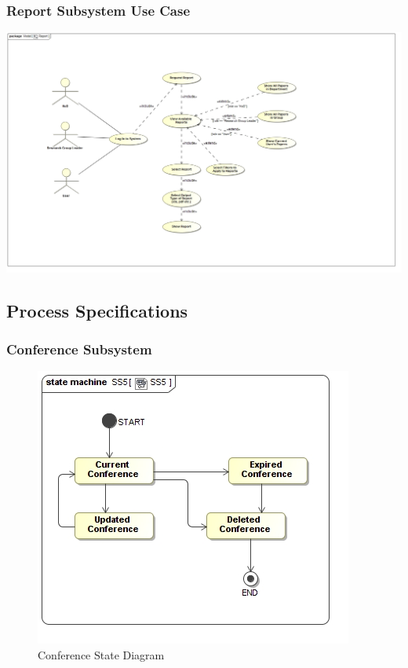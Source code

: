 \documentclass{article}
\begin{document}
			\subsubsection{Report Subsystem Use Case}
				\includegraphics[width=\textwidth]{ReportUseCase}
		\subsection{Process Specifications}
			\subsubsection{Conference Subsystem}
				\begin{figure}
					\includegraphics[width=\textwidth]{5.4-SS5-7/SS5}
					\caption{Conference State Diagram}
				\end{figure}
\end{document}
